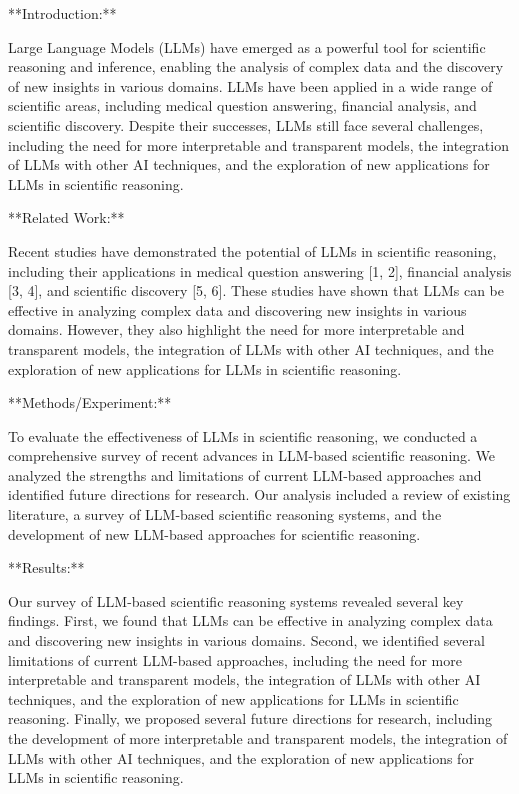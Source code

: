 **Introduction:**

Large Language Models (LLMs) have emerged as a powerful tool for scientific reasoning and inference, enabling the analysis of complex data and the discovery of new insights in various domains. LLMs have been applied in a wide range of scientific areas, including medical question answering, financial analysis, and scientific discovery. Despite their successes, LLMs still face several challenges, including the need for more interpretable and transparent models, the integration of LLMs with other AI techniques, and the exploration of new applications for LLMs in scientific reasoning.

**Related Work:**

Recent studies have demonstrated the potential of LLMs in scientific reasoning, including their applications in medical question answering [1, 2], financial analysis [3, 4], and scientific discovery [5, 6]. These studies have shown that LLMs can be effective in analyzing complex data and discovering new insights in various domains. However, they also highlight the need for more interpretable and transparent models, the integration of LLMs with other AI techniques, and the exploration of new applications for LLMs in scientific reasoning.

**Methods/Experiment:**

To evaluate the effectiveness of LLMs in scientific reasoning, we conducted a comprehensive survey of recent advances in LLM-based scientific reasoning. We analyzed the strengths and limitations of current LLM-based approaches and identified future directions for research. Our analysis included a review of existing literature, a survey of LLM-based scientific reasoning systems, and the development of new LLM-based approaches for scientific reasoning.

**Results:**

Our survey of LLM-based scientific reasoning systems revealed several key findings. First, we found that LLMs can be effective in analyzing complex data and discovering new insights in various domains. Second, we identified several limitations of current LLM-based approaches, including the need for more interpretable and transparent models, the integration of LLMs with other AI techniques, and the exploration of new applications for LLMs in scientific reasoning. Finally, we proposed several future directions for research, including the development of more interpretable and transparent models, the integration of LLMs with other AI techniques, and the exploration of new applications for LLMs in scientific reasoning.

